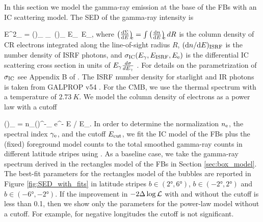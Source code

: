 In this section we model the gamma-ray emission at the base of the FBs with an IC scattering model.
The SED of the gamma-ray intensity is

\be
E^2_\g {} = 
\int \int \left(\right)_{\!\!\ISRF} \sigma_\IC\ \left(\right)_{\!\!\el} \de E_\ISRF\, \de E_\el,
\ee
where $\left(\frac{\text{d} \Sigma}{\text{d} E}\right)_{\!\!\text{e}} = \int \left(\frac{\text{d} n}{\text{d} E}\right)_{\!\!\text{e}} dR$ is the column density 
of CR electrons integrated along the line-of-sight radius $R$,
$(\text{d} n/ \text{d} E)_{\text{ISRF}}$ is the number density of ISRF photons,
and $\sigma_{\text{IC}}(E_\gamma, E_{\text{ISRF}}, E_{\text{e}})$
is the differential IC scattering cross section in units of $E_\gamma\frac{d\sigma}{d E_\gamma}$ \citep{1970RvMP...42..237B}.
For details on the parametrization of $\sigma_{\text{IC}}$ see Appendix B of \cite{2014ApJ...793...64A}.
The ISRF number density for starlight and IR photons is taken from GALPROP v54 \citep{2006ApJ...640L.155M}.
For the CMB, we use the thermal spectrum with a temperature of $\SI{2.73}{K}$.
We model the column density of electrons as a power law with a cutoff

\be 
\label{eq:e_spectrum}
\left(\right)_{\!\!\el} = n_\el \left(\right)^{-\gamma_\el} e^{- E / E_{\cut}}.
\ee
In order to determine the normalization $n_{\text{e}}$, the spectral index $\gamma_{\text{e}}$, and the cutoff  $E_{\text{cut}}$, 
we fit the IC model of the FBs plus the (fixed) foreground model counts to the 
total smoothed gamma-ray counts in different latitude stripes using .
As a baseline case, we take the gamma-ray spectrum derived in the rectangles model of the FBs in Section \ref{sec:box_model}.
The best-fit parameters for the rectangles model of the bubbles are reported in Figure \ref{fig:SED_with_fits}
in latitude stripes $b \in (\ang{2}, \ang{6})$, $b \in (-\ang{2}, \ang{2})$ and $b \in (-\ang{6}, -\ang{2})$. 
If the improvement in $-2 \Delta \log {\mathcal{L}}$ with and without the cutoff is less than 0.1, then we show only the parameters for the power-law model without a cutoff.
For example, for negative longitudes the cutoff is not significant.

